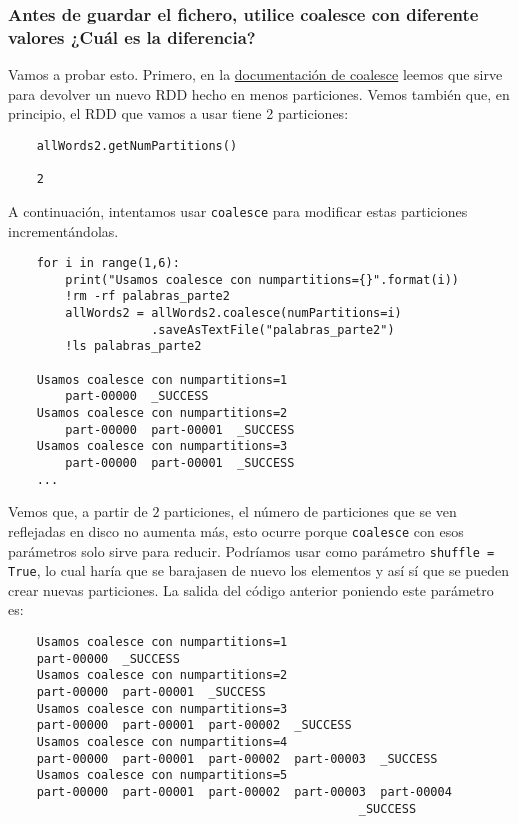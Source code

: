 \documentclass[11pt]{article}
\def\inline{\lstinline[basicstyle=\ttfamily,keywordstyle={}]}
\begin{document}
\subsubsection*{Antes de guardar el fichero, utilice coalesce con diferente valores ¿Cuál es la diferencia?}


Vamos a probar esto. Primero, en la \href{https://spark.apache.org/docs/latest/api/python/reference/api/pyspark.RDD.coalesce.html}{documentación de coalesce} leemos que sirve para devolver un nuevo RDD hecho en menos particiones. Vemos también que, en principio, el RDD que vamos a usar tiene 2 particiones:

\begin{verbatim}
	allWords2.getNumPartitions()
	
	2
\end{verbatim}

A continuación, intentamos usar \inline{coalesce} para modificar estas particiones incrementándolas.

\begin{verbatim}
	for i in range(1,6):
	    print("Usamos coalesce con numpartitions={}".format(i))
	    !rm -rf palabras_parte2
	    allWords2 = allWords2.coalesce(numPartitions=i)
	                .saveAsTextFile("palabras_parte2")
	    !ls palabras_parte2
	
	Usamos coalesce con numpartitions=1
	    part-00000  _SUCCESS
	Usamos coalesce con numpartitions=2
	    part-00000  part-00001	_SUCCESS
	Usamos coalesce con numpartitions=3
	    part-00000  part-00001	_SUCCESS
	...
\end{verbatim}

Vemos que, a partir de $2$ particiones, el número de particiones que se ven reflejadas en disco no aumenta más, esto ocurre porque \inline{coalesce} con esos parámetros solo sirve para reducir. Podríamos usar como parámetro \inline{shuffle = True}, lo cual haría que se barajasen de nuevo los elementos y así sí que se pueden crear nuevas particiones. La salida del código anterior poniendo este parámetro es: 

\begin{verbatim}
	Usamos coalesce con numpartitions=1
	part-00000  _SUCCESS
	Usamos coalesce con numpartitions=2
	part-00000  part-00001	_SUCCESS
	Usamos coalesce con numpartitions=3
	part-00000  part-00001	part-00002  _SUCCESS
	Usamos coalesce con numpartitions=4
	part-00000  part-00001	part-00002  part-00003	_SUCCESS
	Usamos coalesce con numpartitions=5
	part-00000  part-00001	part-00002  part-00003	part-00004 
	                                             _SUCCESS
\end{verbatim}
\end{document}
